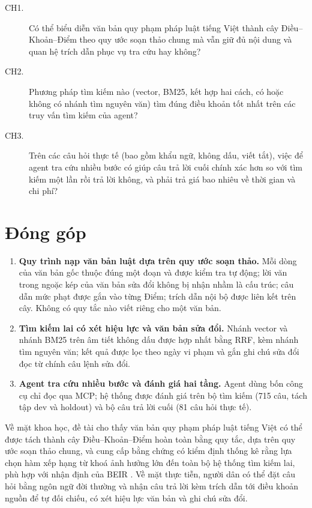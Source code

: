\begin{description}
    \item[CH1.] Có thể biểu diễn văn bản quy phạm pháp luật tiếng Việt thành cây Điều--Khoản--Điểm theo quy ước soạn thảo chung mà vẫn giữ đủ nội dung và quan hệ trích dẫn phục vụ tra cứu hay không?
    \item[CH2.] Phương pháp tìm kiếm nào (vector, BM25, kết hợp hai cách, có hoặc không có nhánh tìm nguyên văn) tìm đúng điều khoản tốt nhất trên các truy vấn tìm kiếm của agent?
    \item[CH3.] Trên các câu hỏi thực tế (bao gồm khẩu ngữ, không dấu, viết tắt), việc để agent tra cứu nhiều bước có giúp câu trả lời cuối chính xác hơn so với tìm kiếm một lần rồi trả lời không, và phải trả giá bao nhiêu về thời gian và chi phí?
\end{description}

\section{Đóng góp}
\label{sec:c1_dong_gop}

\begin{enumerate}
    \item \textbf{Quy trình nạp văn bản luật dựa trên quy ước soạn thảo.} Mỗi dòng của văn bản gốc thuộc đúng một đoạn và được kiểm tra tự động; lời văn trong ngoặc kép của văn bản sửa đổi không bị nhận nhầm là cấu trúc; câu dẫn mức phạt được gắn vào từng Điểm; trích dẫn nội bộ được liên kết trên cây. Không có quy tắc nào viết riêng cho một văn bản.
    \item \textbf{Tìm kiếm lai có xét hiệu lực và văn bản sửa đổi.} Nhánh vector và nhánh BM25 trên âm tiết không dấu được hợp nhất bằng RRF, kèm nhánh tìm nguyên văn; kết quả được lọc theo ngày vi phạm và gắn ghi chú sửa đổi đọc từ chính câu lệnh sửa đổi.
    \item \textbf{Agent tra cứu nhiều bước và đánh giá hai tầng.} Agent dùng bốn công cụ chỉ đọc qua MCP; hệ thống được đánh giá trên bộ tìm kiếm (715 câu, tách tập dev và holdout) và bộ câu trả lời cuối (81 câu hỏi thực tế).
\end{enumerate}

Về mặt khoa học, đề tài cho thấy văn bản quy phạm pháp luật tiếng Việt có thể được tách thành cây Điều--Khoản--Điểm hoàn toàn bằng quy tắc, dựa trên quy ước soạn thảo chung, và cung cấp bằng chứng có kiểm định thống kê rằng lựa chọn hàm xếp hạng từ khoá ảnh hưởng lớn đến toàn bộ hệ thống tìm kiếm lai, phù hợp với nhận định của BEIR \cite{thakur2021beir}. Về mặt thực tiễn, người dân có thể đặt câu hỏi bằng ngôn ngữ đời thường và nhận câu trả lời kèm trích dẫn tới điều khoản nguồn để tự đối chiếu, có xét hiệu lực văn bản và ghi chú sửa đổi.

